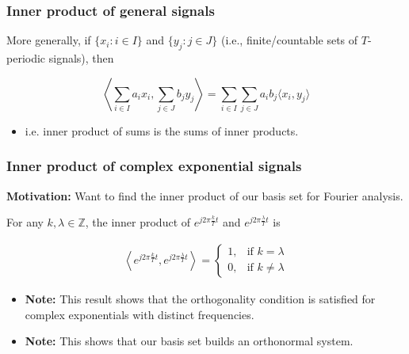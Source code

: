 \subsubsection{Inner product of general signals}
\begin{definition}
    More generally, if $\{x_i : i \in I\}$ and $\{y_j : j \in J\}$ (i.e., finite/countable sets of $T$-periodic signals), then

    \[
    \left\langle \sum_{i \in I} a_i x_i, \sum_{j \in J} b_j y_j \right\rangle = \sum_{i \in I} \sum_{j \in J} a_i b_j \langle x_i, y_j \rangle
    \]
    \begin{itemize}
        \item i.e. inner product of sums is the sums of inner products.
    \end{itemize}
\end{definition}

\subsubsection{Inner product of complex exponential signals}
\textbf{Motivation:} Want to find the inner product of our basis set for Fourier analysis.
\begin{definition}
    For any $k, \lambda \in \mathbb{Z}$, the inner product of $e^{j 2\pi \frac{k}{T} t}$ and $e^{j 2\pi \frac{\lambda}{T} t}$ is

    \begin{align*}
        \left\langle e^{j 2\pi \frac{k}{T} t}, e^{j 2\pi \frac{\lambda}{T} t} \right\rangle =
        \begin{cases}
            1, & \text{if } k = \lambda \\
            0, & \text{if } k \neq \lambda
        \end{cases}
    \end{align*}
    \begin{itemize}
        \item \textbf{Note:} This result shows that the orthogonality condition is satisfied for complex exponentials with distinct frequencies.
        \item \textbf{Note:} This shows that our basis set builds an orthonormal system.
    \end{itemize}
\end{definition}

